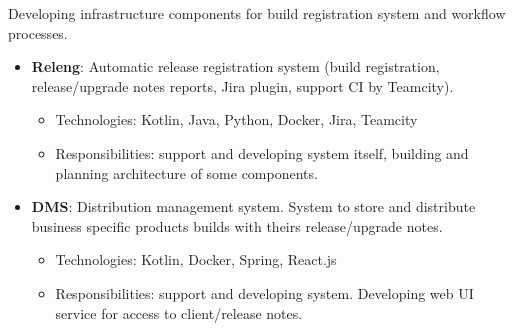 \documentclass{cv}
\begin{document}
\begin{cvblock}{%
		}

	Developing infrastructure components for build registration
	system and workflow processes.

	\begin{itemize}
		\item \textbf{Releng}: Automatic release registration system
		      (build registration, release/upgrade notes reports, Jira plugin,
		      support CI by Teamcity).
		      \begin{itemize}
			      \item Technologies: Kotlin, Java, Python, Docker, Jira, Teamcity
			      \item Responsibilities: support and developing system itself,
			            building and planning architecture of some components.
		      \end{itemize}
		\item \textbf{DMS}: Distribution management system. System to store and distribute
		      business specific products builds with theirs release/upgrade notes.
		      \begin{itemize}
			      \item Technologies: Kotlin, Docker, Spring, React.js
			      \item Responsibilities: support and developing system. Developing web
			            UI service for access to client/release notes.
		      \end{itemize}
	\end{itemize}
\end{cvblock}
\end{document}

